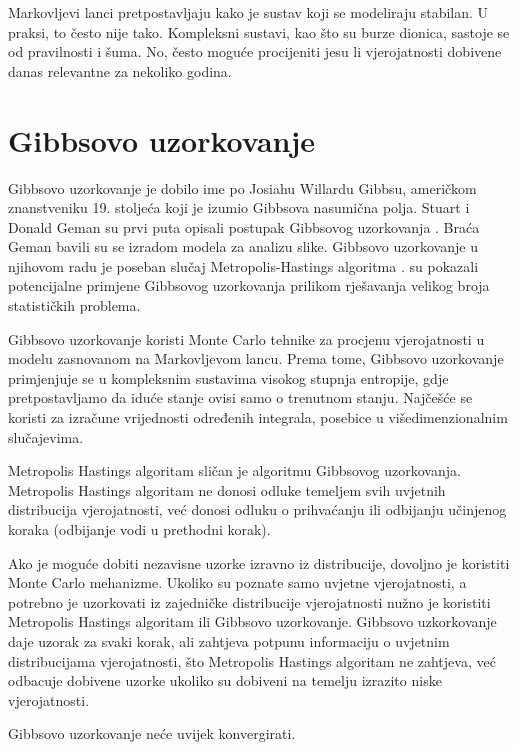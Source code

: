 Markovljevi lanci pretpostavljaju kako je sustav koji se modeliraju stabilan. U praksi, to često nije tako. Kompleksni sustavi, kao što su burze dionica,  sastoje se od pravilnosti i šuma. No, često moguće procijeniti jesu li vjerojatnosti dobivene danas relevantne za nekoliko godina.

\chapter{Gibbsovo uzorkovanje}

Gibbsovo uzorkovanje je dobilo ime po Josiahu Willardu Gibbsu, američkom znanstveniku 19. stoljeća koji je izumio Gibbsova nasumična polja. Stuart i Donald Geman su prvi puta opisali postupak Gibbsovog uzorkovanja \citep{geman1984stochastic}. Braća Geman bavili su se izradom modela za analizu slike. Gibbsovo uzorkovanje u njihovom radu je poseban slučaj Metropolis-Hastings algoritma \citep{metropolis1953equation}. \citep{gelfand1990sampling} su pokazali potencijalne primjene Gibbsovog uzorkovanja prilikom rješavanja velikog broja statističkih problema.

Gibbsovo uzorkovanje koristi Monte Carlo tehnike za procjenu vjerojatnosti u modelu zasnovanom na Markovljevom lancu. Prema tome, Gibbsovo uzorkovanje primjenjuje se u kompleksnim sustavima visokog stupnja entropije, gdje pretpostavljamo da iduće stanje ovisi samo o trenutnom stanju. Najčešće se koristi za izračune vrijednosti određenih integrala, posebice u višedimenzionalnim slučajevima. 

Metropolis Hastings algoritam sličan je algoritmu Gibbsovog uzorkovanja. Metropolis Hastings algoritam ne donosi odluke temeljem svih uvjetnih distribucija vjerojatnosti, već donosi odluku o prihvaćanju ili odbijanju učinjenog koraka (odbijanje vodi u prethodni korak). 

Ako je moguće dobiti nezavisne uzorke izravno iz distribucije, dovoljno je koristiti Monte Carlo mehanizme. Ukoliko su poznate samo uvjetne vjerojatnosti, a potrebno je uzorkovati iz zajedničke distribucije vjerojatnosti nužno je koristiti Metropolis Hastings algoritam ili Gibbsovo uzorkovanje. Gibbsovo uzkorkovanje daje uzorak za svaki korak, ali zahtjeva potpunu informaciju o uvjetnim distribucijama vjerojatnosti, što Metropolis Hastings algoritam ne zahtjeva, već odbacuje dobivene uzorke ukoliko su dobiveni na temelju izrazito niske vjerojatnosti. 

Gibbsovo uzorkovanje neće uvijek konvergirati. 